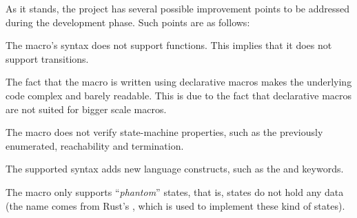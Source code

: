 As it stands, the project has several possible improvement points to be addressed during the development phase.
Such points are as follows:
\begin{compactitem}
    \item The macro's syntax does not support functions. This implies that it does not support transitions.
    \item The fact that the macro is written using declarative macros makes the underlying code complex and barely readable.
    This is due to the fact that declarative macros are not suited for bigger scale macros.
    \item The macro does not verify state-machine properties, such as the previously enumerated, reachability and termination.
    \item The supported syntax adds new language constructs, such as the  and  keywords.
    \item The macro only supports “\emph{phantom}” states, that is, states do not hold any data
    (the name comes from Rust's , which is used to implement these kind of states).
\end{compactitem}



